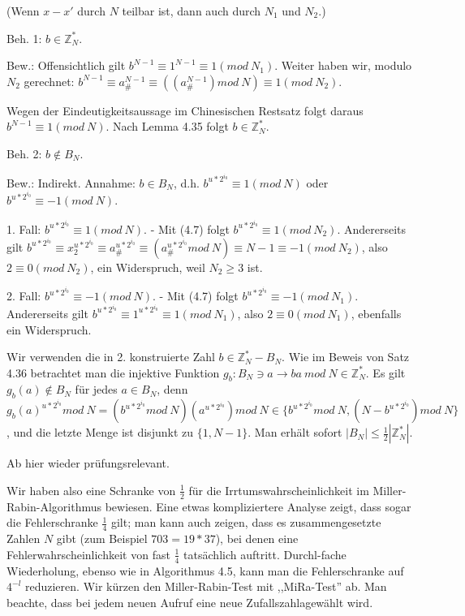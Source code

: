 \documentclass[a4paper]{article}
\begin{document}
\begin{multicols}{3}
\begin{enumerate*}
\begin{itemize*}
                \item (Wenn $x-x'$ durch $N$ teilbar ist, dann auch durch $N_1$ und $N_2$.)
                \item Beh. 1: $b\in\mathbb{Z}^*_N$.
                \item Bew.: Offensichtlich gilt $b^{N-1} \equiv 1^{N-1} \equiv 1 (mod\ N_1)$. Weiter haben wir, modulo $N_2$ gerechnet: $b^{N-1} \equiv a^{N-1}_{\#}\equiv ((a^{N-1}_{\#}) mod\ N)\equiv 1 (mod\ N_2)$.
                \item Wegen der Eindeutigkeitsaussage im Chinesischen Restsatz folgt daraus $b^{N-1} \equiv 1(mod\ N)$. Nach Lemma 4.35 folgt $b\in\mathbb{Z}^*_N$.
                \item Beh. 2: $b\not\in B_N$.
                \item Bew.: Indirekt. Annahme: $b\in B_N$, d.h. $b^{u*2^{i_0}} \equiv 1 (mod\ N)$ oder $b^{u*2^{i_0}} \equiv -1 (mod\ N)$.
                \item 1. Fall: $b^{u*2^{i_0}} \equiv 1 (mod\ N)$. - Mit (4.7) folgt $b^{u*2^{i_0}} \equiv 1 (mod\ N_2)$. Andererseits gilt $b^{u*2^{i_0}} \equiv x^{u*2^{i_0}}_2 \equiv a^{u*2^{i_0}}_{\#}\equiv (a^{u*2^{i_0}}_{\#}mod\ N)\equiv N-1 \equiv -1 (mod\ N_2)$, also $2\equiv 0 (mod\ N_2)$, ein Widerspruch, weil $N_2 \geq 3$ ist.
                \item 2. Fall: $b^{u*2^{i_0}} \equiv  -1 (mod\ N)$. - Mit (4.7) folgt $b^{u*2^{i_0}} \equiv -1(mod\ N_1)$. Andererseits gilt $b^{u*2^{i_0}} \equiv 1^{u*2^{i_0}} \equiv 1 (mod\ N_1)$, also $2\equiv 0 (mod\ N_1)$, ebenfalls ein Widerspruch.
            \end{itemize*}
            \item Wir verwenden die in 2. konstruierte Zahl $b\in\mathbb{Z}^*_N-B_N$. Wie im Beweis von Satz 4.36 betrachtet man die injektive Funktion $g_b:B_N \ni a\rightarrow ba\ mod\ N \in\mathbb{Z}^*_N$. Es gilt $g_b(a)\not\in B_N$ für jedes $a\in B_N$, denn $g_b(a)^{u*2^{i_0}} mod\ N= (b^{u*2^{i_0}} mod\ N)(a^{u*2^{i_0}}) mod\ N\in\{b^{u*2^{i_0}} mod\ N, (N-b^{u*2^{i_0}}) mod\ N\}$, und die letzte Menge ist disjunkt zu $\{1 ,N-1\}$. Man erhält sofort $|B_N|\leq \frac{1}{2} | \mathbb{Z}^*_N|$.
        \end{enumerate*}

        Ab hier wieder prüfungsrelevant.

        Wir haben also eine Schranke von $\frac{1}{2}$ für die Irrtumswahrscheinlichkeit im Miller-Rabin-Algorithmus bewiesen. Eine etwas kompliziertere Analyse zeigt, dass sogar die Fehlerschranke $\frac{1}{4}$ gilt; man kann auch zeigen, dass es zusammengesetzte Zahlen $N$ gibt (zum Beispiel $703 = 19*37$), bei denen eine Fehlerwahrscheinlichkeit von fast $\frac{1}{4}$ tatsächlich auftritt. Durchl-fache Wiederholung, ebenso wie in Algorithmus 4.5, kann man die Fehlerschranke auf $4^{-l}$ reduzieren. Wir kürzen den Miller-Rabin-Test mit ,,MiRa-Test'' ab. Man beachte, dass bei jedem neuen Aufruf eine neue Zufallszahlagewählt wird.


\end{multicols}
\end{document}
